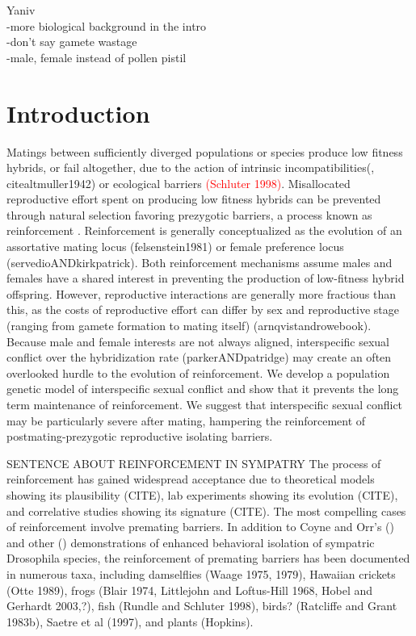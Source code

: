 \documentclass[11pt]{article}
\begin{document}
Yaniv\\
-more biological background in the intro\\
-don't say gamete wastage\\
-male, female instead of pollen pistil\\


\section*{Introduction}


Matings between sufficiently diverged populations or species produce low fitness hybrids, or fail altogether, due to the action of intrinsic incompatibilities(\citealt{dobzhansky1937}, citealt{muller1942}) or ecological barriers \textcolor{red}{(Schluter 1998)}. %
  Misallocated reproductive effort spent on producing low fitness hybrids can be prevented through natural selection favoring prezygotic barriers, a process known as reinforcement \citep{Dobzhansky1937,Servedio:2003dw}.
Reinforcement is generally conceptualized as the evolution of an assortative mating locus (felsenstein1981) or female preference locus (servedioANDkirkpatrick).   
Both reinforcement mechanisms assume males and females have a shared interest in preventing the production of low-fitness hybrid offspring. 
However, reproductive interactions are generally more fractious than this, as the costs of reproductive effort can differ by sex and reproductive stage (ranging from gamete formation to mating itself) (arnqvistandrowebook).  
Because male and female interests are not always aligned, interspecific sexual conflict over the hybridization rate (parkerANDpatridge) may create an often overlooked hurdle to the evolution of reinforcement.   
We develop a population genetic model of interspecific sexual conflict and show that it prevents the long term maintenance of reinforcement.  
We suggest that interspecific sexual conflict may be particularly severe after mating, hampering the reinforcement of postmating-prezygotic reproductive isolating barriers.  

SENTENCE ABOUT REINFORCEMENT IN SYMPATRY
The process of reinforcement has gained widespread acceptance due to theoretical models showing its plausibility (CITE), lab experiments showing its evolution (CITE), and correlative studies showing its signature (CITE).  
The most compelling cases of reinforcement involve premating barriers. 
In addition to Coyne and Orr's () and other () demonstrations of enhanced behavioral isolation of sympatric Drosophila species, the reinforcement of premating barriers has been documented in numerous taxa, including damselflies (Waage 1975, 1979), Hawaiian crickets (Otte 1989), frogs (Blair 1974, Littlejohn and Loftus-Hill 1968, Hobel and Gerhardt 2003,?), fish (Rundle and Schluter 1998), birds? (Ratcliffe and Grant 1983b), Saetre et al (1997), and plants (Hopkins). %
\end{document}
